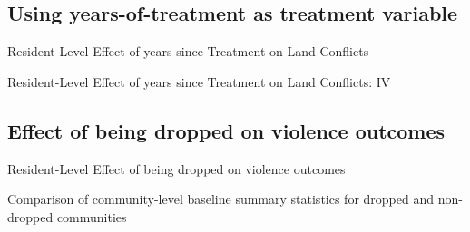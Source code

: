 \documentclass[10pt]{article}
\begin{document}
\subsection{Using years-of-treatment as treatment variable}

\begin{landscape}
\begin{table}[H]
\caption{Resident-Level Effect of years since Treatment on Land Conflicts}
\begin{center}
\begin{adjustbox}{max height = .6\textheight}

\end{adjustbox}
\end{center}
\end{table}

\begin{table}[H]
\caption{Resident-Level Effect of years since Treatment on Land Conflicts: IV}
\begin{center}
\begin{adjustbox}{max width = \textwidth}

\end{adjustbox}
\end{center}
\end{table}
\end{landscape}


\subsection{Effect of being dropped on violence outcomes}
\begin{table}[H]
\caption{Resident-Level Effect of being dropped on violence outcomes}
\label{conflict_adj_p_dropped}
\begin{center}
\begin{adjustbox}{max width = \textwidth}

\end{adjustbox}
\end{center}
\end{table}

\begin{table}[H]
\caption{Comparison of community-level baseline summary statistics for dropped and non-dropped communities}
\label{summary_table_dropped}
\begin{center}
\begin{adjustbox}{max width = \textwidth}

\end{adjustbox}
\end{center}
\end{table}
\end{document}
